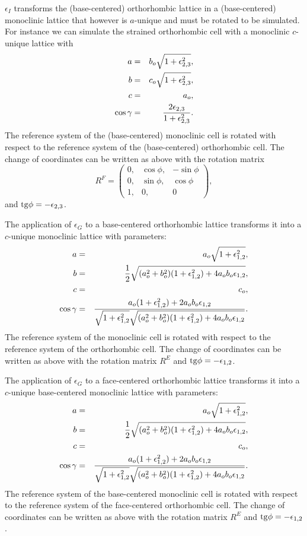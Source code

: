 \documentclass[12pt,a4paper]{article}
\begin{document}
$\epsilon_I$ transforms the (base-centered) orthorhombic lattice 
in a (base-centered) monoclinic lattice that 
however is $a$-unique and must be rotated to be simulated.
For instance we can simulate the strained orthorhombic cell with a monoclinic
$c$-unique lattice with
\begin{eqnarray}
a&=&b_o \sqrt{1+\epsilon_{2,3}^2}, \\
b&=&c_o \sqrt{1+\epsilon_{2,3}^2}, \\
c&=&a_o, \\
\cos\gamma &=& {2 \epsilon_{2,3} \over 1 + \epsilon_{2,3}^2}. 
\end{eqnarray}
The reference system of the (base-centered) monoclinic cell is 
rotated with respect to
the reference system of the (base-centered) orthorhombic cell. 
The change of coordinates can be written as above with the rotation matrix 
\begin{equation}
R^F=\left( \begin{array}{ccc}
0, & \cos \phi, &  -\sin \phi
\\
0, & \sin \phi, & \cos \phi 
\\
1, & 0, & 0
\end{array}
\right),
\end{equation}
and ${\rm tg} \phi =-\epsilon_{2,3}$. 

The application of $\epsilon_G$ to a base-centered orthorhombic lattice
transforms it into a $c$-unique monoclinic lattice with parameters:
\begin{eqnarray}
a&=&a_o \sqrt{1+\epsilon_{1,2}^2}, \\
b&=&{1\over 2} \sqrt{(a_o^2+b_o^2)(1+\epsilon_{1,2}^2)+4a_ob_o\epsilon_{1,2}}, \\
c&=&c_o,  \\
\cos\gamma &=& {a_o (1+\epsilon_{1,2}^2)+2a_ob_o\epsilon_{1,2} \over
\sqrt{1+\epsilon_{1,2}^2} \sqrt{(a_o^2+b_o^2)
(1+\epsilon_{1,2}^2)+4a_ob_o\epsilon_{1,2}}}. 
\end{eqnarray}
The reference system of the monoclinic cell is rotated with respect to
the reference system of the orthorhombic cell. 
The change of coordinates can be written as above with the rotation matrix 
$R^E$ and ${\rm tg}\phi=-\epsilon_{1,2}$.

The application of $\epsilon_G$ to a face-centered orthorhombic lattice
transforms it into a $c$-unique base-centered monoclinic lattice with 
parameters:
\begin{eqnarray}
a&=&a_o \sqrt{1+\epsilon_{1,2}^2}, \\
b&=&{1\over 2} \sqrt{(a_o^2+b_o^2)(1+\epsilon_{1,2}^2)+4a_ob_o\epsilon_{1,2}}, \\
c&=&c_o,  \\
\cos\gamma &=& {a_o (1+\epsilon_{1,2}^2)+2a_ob_o\epsilon_{1,2} \over
\sqrt{1+\epsilon_{1,2}^2} \sqrt{(a_o^2+b_o^2)
(1+\epsilon_{1,2}^2)+4a_ob_o\epsilon_{1,2}}}. 
\end{eqnarray}
The reference system of the base-centered monoclinic cell is rotated 
with respect to the reference system of the face-centered orthorhombic cell. 
The change of coordinates can be written as above with the rotation matrix 
$R^E$ and ${\rm tg}\phi=-\epsilon_{1,2}$.
\end{document}
